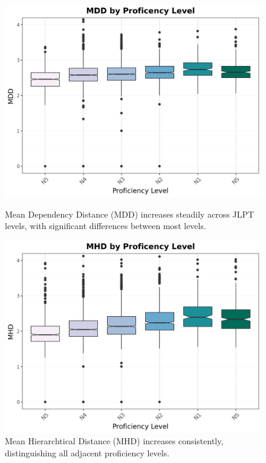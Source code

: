 \begin{figure}[htbp]
    \centering
    \begin{minipage}{.48\textwidth}
        \centering
    \includegraphics[scale=.4]{img/MDD}
    \caption[Mean Dependency Distance across JLPT Proficiency Levels]{Mean Dependency Distance (MDD) increases steadily across JLPT levels, with significant differences between most levels.}
        \label{fig:mdd}
    \end{minipage}
    \hfill
\begin{minipage}{.48\textwidth}
        \centering
        \includegraphics[scale=.4]{img/MHD}
        \caption[Mean Hierarchtical Distance across JLPT Proficiency Levels]{Mean Hierarchtical Distance (MHD) increases consistently, distinguishing all adjacent proficiency levels.}
\label{fig:mhd}
\end{minipage}
    \end{figure}


